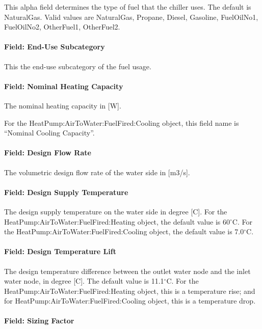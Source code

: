 This alpha field determines the type of fuel that the chiller uses. The default is NaturalGas. Valid values are NaturalGas, Propane, Diesel, Gasoline, FuelOilNo1, FuelOilNo2, OtherFuel1, OtherFuel2.

\paragraph{Field: End-Use Subcategory}

This the end-use subcategory of the fuel usage.

\paragraph{Field: Nominal Heating Capacity}

The nominal heating capacity in [W].

For the HeatPump:AirToWater:FuelFired:Cooling object, this field name is ``Nominal Cooling Capacity''.

\paragraph{Field: Design Flow Rate}

The volumetric design flow rate of the water side in [m3/s].

\paragraph{Field: Design Supply Temperature}

The design supply temperature on the water side in degree [C]. For the HeatPump:AirToWater:FuelFired:Heating object, the default value is 60$^\circ$C. For the HeatPump:AirToWater:FuelFired:Cooling object, the default value is 7.0$^\circ$C.

\paragraph{Field: Design Temperature Lift}

The design temperature difference between the outlet water node and the inlet water node, in degree [C]. The default value is 11.1$^\circ$C. For the HeatPump:AirToWater:FuelFired:Heating object, this is a temperature rise; and for HeatPump:AirToWater:FuelFired:Cooling object, this is a temperature drop.

\paragraph{Field: Sizing Factor}

